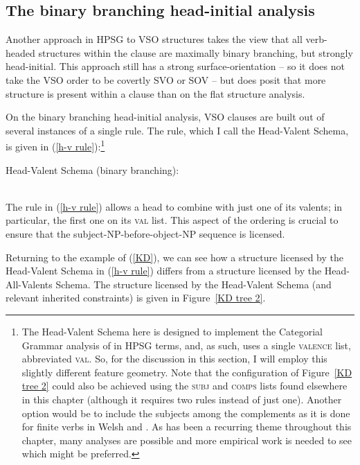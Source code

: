 \documentclass[output=paper
 	        ,biblatex
                ,babelshorthands
                ,newtxmath
                ,draftmode
                ,colorlinks, citecolor=brown
]{langscibook}
\begin{document}
\subsection{The binary branching head-initial analysis} 

Another approach in HPSG to VSO structures takes the view that all verb-headed structures within the clause are maximally binary branching, but strongly head-initial. This approach still has a strong surface-orientation -- so it does not take the VSO order to be covertly SVO or SOV -- but does posit that more structure is present within a clause than on the flat structure analysis. 

On the binary branching head-initial analysis, VSO clauses are built out of several instances of a
single rule. The rule, which I call the Head-Valent Schema, is given in (\ref{h-v
  rule}):\footnote{The Head-Valent Schema here is designed to implement the Categorial Grammar
  analysis of \citet{keenan2000} in HPSG terms, and, as such, uses a single \textsc{valence} list,
  abbreviated \textsc{val}. So, for the discussion in this section, I will employ this slightly
  different feature geometry. Note that the configuration of Figure~\ref{KD tree 2} could also be
  achieved using the \textsc{subj} and \textsc{comps} lists found elsewhere in this chapter
  (although it requires two rules instead of just one). Another option would be to include the
  subjects among the complements as it is done for finite verbs in Welsh \parencites[]{Borsley89b}[--118]{borsley95} and  \citep[]{Pollard90a}. As has been a recurring theme throughout this chapter, many
  analyses are possible and more empirical work is needed to see which might be preferred.}  
%
\begin{exe}
\ex \label{h-v rule}
Head-Valent Schema (binary branching):\\
 \impl  \\
\end{exe}
%
The rule in (\ref{h-v rule}) allows a head to combine with just one of its valents; in particular, the first one on its \textsc{val} list. This aspect of the ordering is crucial to ensure that the subject-NP-before-object-NP sequence is licensed.

Returning to the  example of (\ref{KD}), we can see how a structure licensed by the Head-Valent Schema in (\ref{h-v rule}) differs from a structure licensed by the Head-All-Valents Schema. The structure licensed by the Head-Valent Schema (and relevant inherited constraints) is given in Figure~\ref{KD tree 2}.
\end{document}
